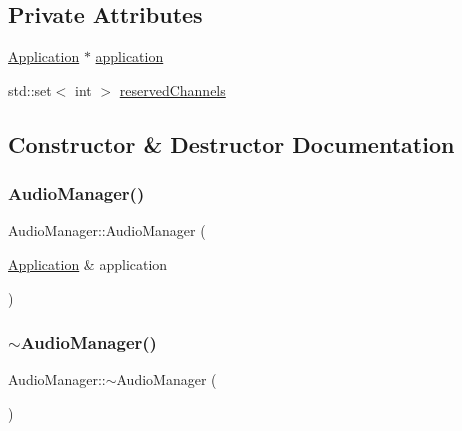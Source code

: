 \subsection*{Private Attributes}
\begin{DoxyCompactItemize}
\item 
\mbox{\hyperlink{classsage_1_1Application}{Application}} $\ast$ \mbox{\hyperlink{classsage_1_1AudioManager_af7c3bc03cba5e7460e45b03ca8a9bf01}{application}}
\item 
std\+::set$<$ int $>$ \mbox{\hyperlink{classsage_1_1AudioManager_a33e6f086e5dd82256d9b38edf6a56521}{reserved\+Channels}}
\end{DoxyCompactItemize}


\subsection{Constructor \& Destructor Documentation}
\mbox{\label{classsage_1_1AudioManager_a20f39b8bf96f29d6b5a56bfe05f2baf3}} 
\subsubsection{\texorpdfstring{AudioManager()}{AudioManager()}}
{\footnotesize\ttfamily Audio\+Manager\+::\+Audio\+Manager (\begin{DoxyParamCaption}\item[{\mbox{\hyperlink{classsage_1_1Application}{Application}} \&}]{application }\end{DoxyParamCaption})}

\mbox{\label{classsage_1_1AudioManager_ad94dc46723c6d7cf8c81fc3772a842aa}} 
\subsubsection{\texorpdfstring{$\sim$AudioManager()}{~AudioManager()}}
{\footnotesize\ttfamily Audio\+Manager\+::$\sim$\+Audio\+Manager (\begin{DoxyParamCaption}{ }\end{DoxyParamCaption})}



